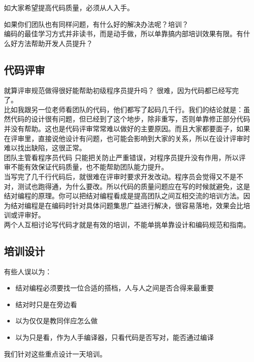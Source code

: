 如大家希望提高代码质量，必须从人入手。

如果你们团队也有同样问题，有什么好的解决办法呢？培训？\\
编码的最佳学习方式并非读书，而是动手做，所以单靠搞内部培训效果有限。有什么好方法帮助开发人员提升？

\hypertarget{ux4ee3ux7801ux8bc4ux5ba1}{%
\subsection{代码评审}\label{ux4ee3ux7801ux8bc4ux5ba1}}

就算评审规范做得很好能帮助初级程序员提升吗？
很难，因为代码都已经写完了。\\
比如我跟另一位老师看团队的代码，他们都写了起码几千行。我们的结论就是：虽然代码的设计很有问题，但已经到了这个地步，除非重写，否则单靠修正部分代码并没有帮助。这也是代码评审常常难以做好的主要原因。而且大家都要面子，如果在评审里，直接说他设计有问题，也可能会影响到大家的关系，所以在设计评审时难以找出缺陷，这很正常。\\
团队主管看程序员代码
只能把关防止严重错误，对程序员提升没有作用，所以评审不能有效保证代码质量，也不能帮助团队能力提升。\\
当写完了几千行代码后，就很难在评审时要求开发改动。程序员会觉得又不是不对，测试也跑得通，为什么要改。所以代码的质量问题应在写的时候就避免，这是结对编程的原理。你可以把结对编程看成是提高团队之间互相交流的培训方法。因为结对编程是在编码时针对具体问题集思广益进行解决，很容易落地，效果会比培训或评审好。\\
两个人互相讨论写代码才就是有效的培训，不能单挑单靠设计和编码规范和指南。

\hypertarget{ux57f9ux8badux8bbeux8ba1}{%
\subsection{培训设计}\label{ux57f9ux8badux8bbeux8ba1}}

有些人误以为：

\begin{itemize}
\tightlist
\item
  结对编程必须要找一位合适的搭档，人与人之间是否合得来最重要
\item
  结对时只是在旁边看
\item
  以为仅仅是教同伴应怎么做
\item
  以为只是看，作为人手编译器，只看代码是否写对，能否通过编译
\end{itemize}

我们针对这些重点设计一天培训。

